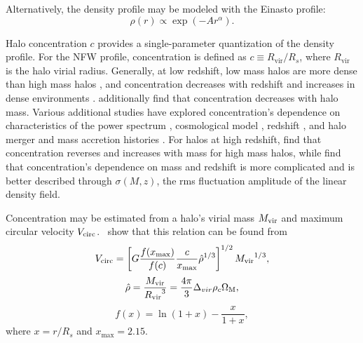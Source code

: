 Alternatively, the density profile may be modeled with the Einasto \citep{1989A&A...223...89E} profile:
\begin{equation} \label{eq:einasto_profile}
	\rho(r) \propto \exp \left( -Ar^{\alpha} \right).
\end{equation}

Halo concentration $c$ provides a single-parameter quantization of the density profile.  For the NFW profile, concentration is defined as $c \equiv R_{\mathrm{vir}} / R_{s}$, where $R_{\mathrm{vir}}$ is the halo virial radius.  Generally, at low redshift, low mass halos are more dense than high mass halos \citep{1997ApJ...490..493N}, and concentration decreases with redshift and increases in dense environments \citep{2001MNRAS.321..559B}.  \citet{2007MNRAS.381.1450N} additionally find that concentration decreases with halo mass.  Various additional studies have explored concentration's dependence on characteristics of the power spectrum \citep{2001ApJ...554..114E}, cosmological model \citep{2008MNRAS.391.1940M}, redshift \citep{2008MNRAS.387..536G, 2011MNRAS.411..584M}, and halo merger and mass accretion histories \citep{2002ApJ...568...52W, 2003MNRAS.339...12Z, 2009ApJ...707..354Z}.  For halos at high redshift, \citet{2011ApJ...740..102K} find that concentration reverses and increases with mass for high mass halos, while \citet{2012MNRAS.423.3018P} find that concentration's dependence on mass and redshift is more complicated and is better described through $\sigma(M,z)$, the rms fluctuation amplitude of the linear density field.

Concentration may be estimated from a halo's virial mass ${M_{\mathrm{vir}}}$ and maximum circular velocity ${V_{\mathrm{circ}}}$.  \cn\ show that this relation can be found from
\begin{equation}
	{V_{\mathrm{circ}}} = \left[ G \frac{f(x_{\max})}{f(c)} \frac{c}{x_{\max}} \hat{\rho}^{1/3} \right]^{1/2} {M_{\mathrm{vir}}}^{1/3},
\end{equation}
\begin{equation}
	\hat{\rho} = \frac{{M_{\mathrm{vir}}}}{{R_{\mathrm{vir}}}^{3}} = \frac{4 \pi}{3} \Delta_{vir} \rho_{c} \Omega_{\mathrm{M}},
\end{equation}
\begin{equation}
	f(x) = \ln(1 + x) - \frac{x}{1 + x},
\end{equation}
where $x = r / R_{s}$ and $x_{\max} = 2.15$.

